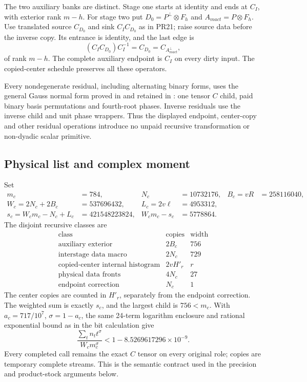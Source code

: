 The two auxiliary banks are distinct. Stage one starts at identity
and ends at $C_I$, with exterior rank $m-h$. For stage two put
$D_0=P^\perp\otimes F_h$ and $A_{
m act}=P\otimes F_h$.
Use translated source $C_{D_0}$ and sink $C_IC_{D_0}$ as in PR21;
raise source data before the inverse copy. Its entrance is identity,
and the last edge is
\[
 (C_IC_{D_0})C_I^{-1}=C_{D_0}=C_{A_{
m act}^\perp},
\]
of rank $m-h$. The complete auxiliary endpoint is $C_I$ on every
dirty input. The copied-center schedule preserves all these operators.

Every nondegenerate residual, including alternating binary forms,
uses the general Gauss normal form proved in
 and retained in
: one tensor $C$ child,
paid binary basis permutations and fourth-root phases. Inverse residuals
use the inverse child and unit phase wrappers. Thus the displayed
endpoint, center-copy and other residual operations introduce no
unpaid recursive transformation or non-dyadic scalar primitive.

\subsection{Physical list and complex moment}
Set
\[
\begin{aligned}
 m_c&=784,&N_c&=10732176,&B_c=vR&=258116040,\\
 W_c=2N_c+2B_c&=537696432,&L_c=2v\ell&=4953312,\\
 s_c=W_cm_c-N_c+L_c&=421548223824,&W_cm_c-s_c&=5778864.
\end{aligned}
\]
The disjoint recursive classes are
\[
\begin{array}{l|r|r}
\text{class}&\text{copies}&\text{width}\\\hline
\text{auxiliary exterior}&2B_c&756\\
\text{interstage data macro}&2N_c&729\\
\text{copied-center internal histogram}&2vH'_r&r\\
\text{physical data fronts}&4N_c&27\\
\text{endpoint correction}&N_c&1
\end{array}
\]
The center copies are counted in $H'_r$, separately from the endpoint
correction. The weighted sum is exactly $s_c$, and the largest child
is $756<m_c$. With $a_c=717/10^7$, $\sigma=1-a_c$, the same
24-term logarithm enclosure and rational exponential bound as in the
bit calculation give
\[
 \frac{\sum_tn_tt^\sigma}{W_cm_c^\sigma}
 <1-8.5269617296\times10^{-9}.
\]
Every completed call remains the exact $C$ tensor on every original
role; copies are temporary complete streams. This is the semantic
contract used in the precision and product-stock arguments below.
